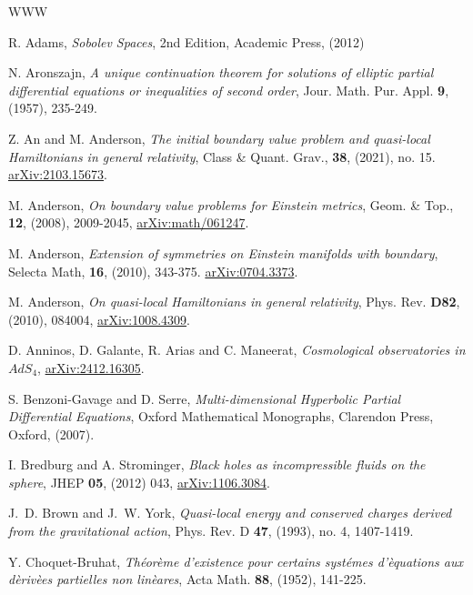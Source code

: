 \documentclass[10pt]{amsart}
\newcommand{\<}{\langle}
\renewcommand{\>}{\rangle}
\theoremstyle{plain}
\theoremstyle{remark}
\theoremstyle{definition}
\numberwithin{equation}{section}
\begin{document}
\begin{thebibliography}{WWW}

\footnotesize 

 R. Adams, {\it Sobolev Spaces}, 2nd Edition, Academic Press, (2012) 

 N. Aronszajn, {\it  A unique continuation theorem for solutions of elliptic partial differential equations or inequalities of second 
order},  Jour. Math. Pur. Appl. {\bf 9}, (1957), 235-249. 

 Z. An and M. Anderson, {\it The initial boundary value problem and quasi-local Hamiltonians in general relativity}, 
Class \& Quant. Grav., {\bf 38},  (2021), no. 15. \href{https://arXiv.org/abs/2103.15673}{arXiv:2103.15673}. 

 M. Anderson, {\it On boundary value problems for Einstein metrics}, Geom. \& Top., {\bf 12}, (2008), 2009-2045, 
\href{https://arXiv.org/abs/math/061247}{arXiv:math/061247}. 

 M. Anderson, {\it Extension of symmetries on Einstein manifolds with boundary}, Selecta Math, {\bf 16}, (2010), 343-375. 
\href{https://arXiv.org/abs/0704.3373}{arXiv:0704.3373}. 

 M. Anderson, {\it On quasi-local Hamiltonians in general relativity}, Phys. Rev. {\bf D82}, (2010), 084004, 
\href{https://arXiv.org/abs/1008.4309}{arXiv:1008.4309}. 

 D. Anninos, D. Galante, R. Arias and C. Maneerat, {\it Cosmological observatories in $AdS_4$}, 
\href{https://arXiv.org/abs/2412.16305}{arXiv:2412.16305}. 

 S. Benzoni-Gavage and D. Serre, {\it Multi-dimensional Hyperbolic Partial Differential Equations}, Oxford 
Mathematical Monographs, Clarendon Press, Oxford, (2007).  

 I. Bredburg and A. Strominger, {\it Black holes as incompressible fluids on the sphere}, 
JHEP {\bf 05}, (2012) 043, \href{https://arXiv.org/abs/1106.3084}{arXiv:1106.3084}. 

 J.~D. Brown and J.~W. York, {\it Quasi-local energy and conserved charges derived from the gravitational action}, 
Phys. Rev. D {\bf 47}, (1993), no. 4, 1407-1419. 

 Y. Choquet-Bruhat, {\it Th\'eor\`eme d'existence pour certains syst\'emes d'\`equations aux d\`eriv\`ees partielles 
non lin\`eares}, Acta Math. {\bf 88}, (1952), 141-225. 


\end{thebibliography}
\end{document}
